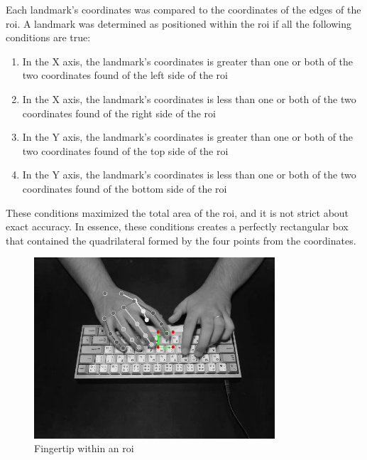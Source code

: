 \documentclass{report}
\begin{document}
Each landmark's coordinates was compared to the coordinates of the edges of the
\ac{roi}. A landmark was determined as positioned within the \ac{roi} if all the
following conditions are true:
\begin{enumerate}
	\item In the X axis, the landmark's coordinates is greater than one or both of
	      the two coordinates found of the left side of the \ac{roi}
	\item In the X axis, the landmark's coordinates is less than one or both of
	      the two coordinates found of the right side of the \ac{roi}
	\item In the Y axis, the landmark's coordinates is greater than one or both of
	      the two coordinates found of the top side of the \ac{roi}
	\item In the Y axis, the landmark's coordinates is less than one or both of
	      the two coordinates found of the bottom side of the \ac{roi}
\end{enumerate}

These conditions maximized the total area of the \ac{roi}, and it is not strict
about exact accuracy. In essence, these conditions creates a perfectly
rectangular box that contained the quadrilateral formed by the four points from
the coordinates.

\begin{figure}[H]
	\centering
	\includegraphics[width=0.8\textwidth]{detected-finger.png}
	\caption{Fingertip within an \ac{roi}}
	\centering
\end{figure}
\end{document}
